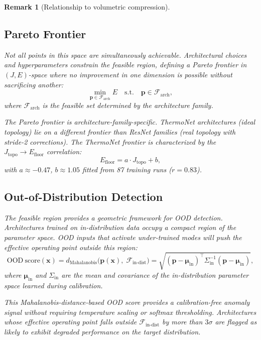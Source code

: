 \documentclass[11pt, a4paper]{article}
\theoremstyle{plain}
\newtheorem*{remark}{Remark}
\begin{document}
\begin{remark}[Relationship to volumetric compression]
\subsection{Pareto Frontier}

Not all points in this space are simultaneously achievable. Architectural choices and hyperparameters constrain the feasible region, defining a Pareto frontier in $(J, E)$-space where no improvement in one dimension is possible without sacrificing another:
\begin{equation}
\min_{\mathbf{p} \in \mathcal{F}_{\mathrm{arch}}} E \quad \text{s.t.} \quad \mathbf{p} \in \mathcal{F}_{\mathrm{arch}},
\end{equation}
where $\mathcal{F}_{\mathrm{arch}}$ is the feasible set determined by the architecture family.

The Pareto frontier is architecture-family-specific. ThermoNet architectures (ideal topology) lie on a different frontier than ResNet families (real topology with stride-2 corrections). The ThermoNet frontier is characterized by the $J_{\mathrm{topo}} \to E_{\mathrm{floor}}$ correlation:
\begin{equation}
E_{\mathrm{floor}} = a \cdot J_{\mathrm{topo}} + b,
\end{equation}
with $a \approx -0.47$, $b \approx 1.05$ fitted from 87 training runs ($r = 0.83$).

\subsection{Out-of-Distribution Detection}

The feasible region provides a geometric framework for OOD detection. Architectures trained on in-distribution data occupy a compact region of the parameter space. OOD inputs that activate under-trained modes will push the effective operating point outside this region:
\begin{equation}
\mathrm{OOD\ score}(\mathbf{x}) = d_{\mathrm{Mahalanobis}}\bigl(\mathbf{p}(\mathbf{x}),\;\mathcal{F}_{\mathrm{in\text{-}dist}}\bigr) = \sqrt{(\mathbf{p} - \boldsymbol{\mu}_{\mathrm{in}})^\top \Sigma_{\mathrm{in}}^{-1}(\mathbf{p} - \boldsymbol{\mu}_{\mathrm{in}})},
\end{equation}
where $\boldsymbol{\mu}_{\mathrm{in}}$ and $\Sigma_{\mathrm{in}}$ are the mean and covariance of the in-distribution parameter space learned during calibration.

This Mahalanobis-distance-based OOD score provides a calibration-free anomaly signal without requiring temperature scaling or softmax thresholding. Architectures whose effective operating point falls outside $\mathcal{F}_{\mathrm{in\text{-}dist}}$ by more than $3\sigma$ are flagged as likely to exhibit degraded performance on the target distribution.


\end{remark}
\end{document}
